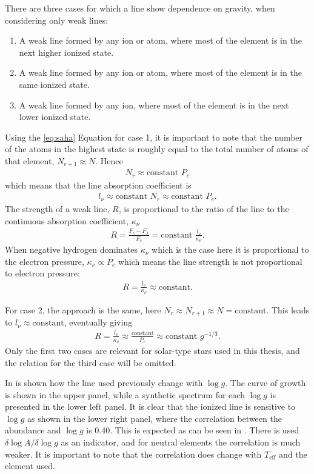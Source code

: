 There are three cases for which a line show dependence on gravity, when considering only weak lines:
\begin{enumerate}
  \item A weak line formed by any ion or atom, where most of the element is in the next higher ionized state.
  \item A weak line formed by any ion or atom, where most of the element is in the same ionized state.
  \item A weak line formed by any ion, where most of the element is in the next lower ionized state.
\end{enumerate}

Using the \ref{eq:saha} Equation for case 1, it is important to note that the number of the atoms in the
highest state is roughly equal to the total number of atoms of that element, $N_{r+1}\approx N$.
Hence
\begin{align}
  N_r \approx \mathrm{constant}\,\, P_e
\end{align}
which means that the line absorption coefficient is
\begin{align}
  l_\nu \approx \mathrm{constant}\,\, N_r \approx \mathrm{constant}\,\, P_e.
\end{align}
The strength of a weak line, $R$, is proportional to the ratio of the line to the continuous
absorption coefficient, $\kappa_\nu$
\begin{align}
  R = \frac{F_c-F_\lambda}{F_c} = \mathrm{constant}\,\, \frac{l_\nu}{\kappa_\nu}.
\end{align}
When negative hydrogen dominates $\kappa_\nu$ which is the case here it is proportional to the
electron pressure, $\kappa_\nu\propto P_e$ which means the line strength is not proportional to
electron pressure:
\begin{align}
  R = \frac{l_\nu}{\kappa_\nu} \approx \mathrm{constant}.
\end{align}

For case 2, the approach is the same, here $N_r\approx N_{r+1}\approx N= \mathrm{constant}$. This
leads to $l_\nu\approx\mathrm{constant}$, eventually giving
\begin{align}
  R=\frac{l_\nu}{\kappa_\nu} \approx \frac{\mathrm{constant}}{P_e} \approx \mathrm{constant}\,\, g^{-1/3}.
\end{align}
Only the first two cases are relevant for solar-type stars used in this thesis, and the relation for
the third case will be omitted.

In  is shown how the  line used previously change with $\log g$. The
curve of growth is shown in the upper panel, while a synthetic spectrum for each $\log g$ is
presented in the lower left panel. It is clear that the ionized line is sensitive to $\log g$ as
shown in the lower right panel, where the correlation between the abundance and $\log g$ is 0.40.
This is expected as can be seen in \citet[][Table 16.1]{Gray2006}. There is used $\delta\log
A/\delta\log g$ as an indicator, and for neutral elements the correlation is much weaker. It is
important to note that the correlation does change with $T_\mathrm{eff}$ and the element used.

